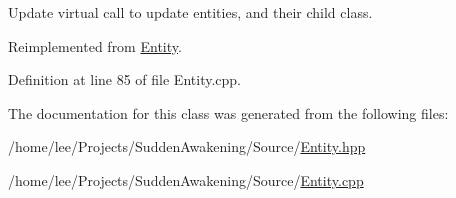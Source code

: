 Update virtual call to update entities, and their child class. 



Reimplemented from \hyperlink{class_entity_a7e2a7c5df3bceaf41deea192eeba4d8f}{Entity}.



Definition at line 85 of file Entity.\-cpp.



The documentation for this class was generated from the following files\-:\begin{DoxyCompactItemize}
\item 
/home/lee/\-Projects/\-Sudden\-Awakening/\-Source/\hyperlink{_entity_8hpp}{Entity.\-hpp}\item 
/home/lee/\-Projects/\-Sudden\-Awakening/\-Source/\hyperlink{_entity_8cpp}{Entity.\-cpp}\end{DoxyCompactItemize}
